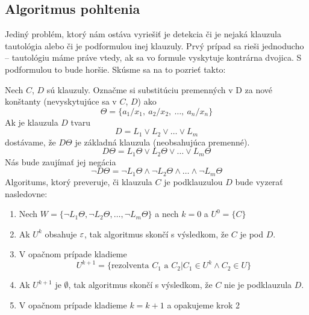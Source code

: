 \subsection{Algoritmus  pohltenia}
Jediný problém, ktorý nám ostáva vyriešiť je detekcia či je nejaká
klauzula tautológia alebo či je podformulou inej klauzuly. Prvý prípad
sa rieši jednoducho -- tautológiu máme práve vtedy, ak sa vo formule
vyskytuje kontrárna dvojica. S podformulou to bude horšie.
Skúsme sa na to pozrieť takto:

Nech $C$, $D$ sú klauzuly. Označme si substitúciu premenných v D za
nové konštanty (nevyskytujúce sa v $C$, $D$) ako
\begin{equation*}
    \Theta = \{ a_1 / x_1,\ a_2 / x_2,\ \ldots,\ a_n / x_n \}
\end{equation*}
%
Ak je klauzula $D$ tvaru
\begin{equation*}
    D = L_1 \lor L_2 \lor \ldots \lor L_m
\end{equation*}
dostávame, že $D\Theta$ je základná klauzula (neobsahujúca premenné).
%
\begin{equation*}
    D \Theta = L_1\Theta \lor L_2 \Theta \lor \ldots \lor L_m \Theta
\end{equation*}
%
Nás bude zaujímať jej negácia
\begin{equation*}
\neg D\Theta = \neg L_1 \Theta \land \neg L_2 \Theta 
                \land \ldots \land \neg L_m \Theta
\end{equation*}
%
Algoritums, ktorý preveruje, či klauzula $C$ je podklauzulou $D$ bude
vyzerať nasledovne:

\begin{enumerate}
    \item Nech 
        $W = \{ \neg L_1 \Theta, \neg L_2 \Theta, \ldots, \neg L_m \Theta \}$
        a nech $k=0$ a $U^0 = \{ C \}$

    \item Ak $U^k$ obsahuje $\varepsilon$, tak algoritmus skončí
        s výsledkom, že $C$ je pod $D$.

    \item V opačnom prípade kladieme 
        \begin{equation*}
            U^{k+1} = \{ \mbox{rezolventa } C_1 \mbox{ a } C_2 | 
            C_1 \in U^{k} \land C_2 \in U\}
        \end{equation*}

    \item Ak $U^{k+1}$ je $\emptyset$, tak algoritmus skončí s
        výsledkom, že  $C$ nie je podklauzula $D$. 

    \item V opačnom prípade kladieme $k=k+1$ a opakujeme krok 2
\end{enumerate}

